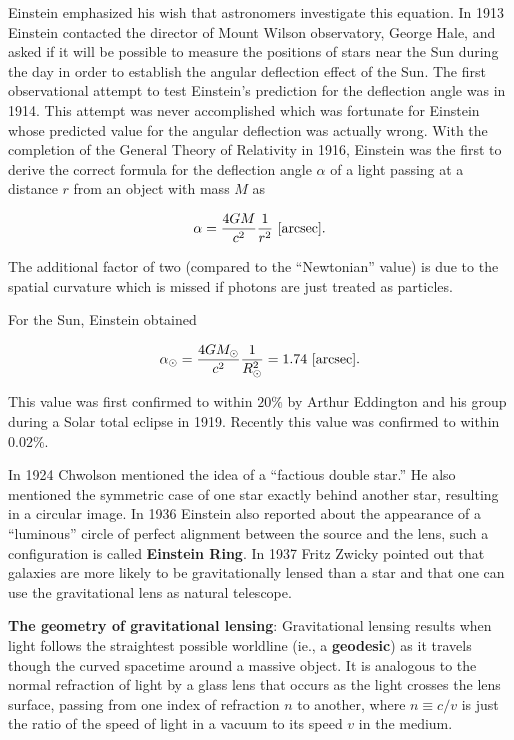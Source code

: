 \documentclass[a4paper,10pt]{article}
\begin{document}
{\noindent}Einstein emphasized his wish that astronomers investigate this equation. In 1913 Einstein contacted the director of Mount Wilson observatory, George Hale, and asked if it will be possible to measure the positions of stars near the Sun during the day in order to establish the angular deflection effect of the Sun. The first observational attempt to test Einstein's prediction for the deflection angle was in 1914. This attempt was never accomplished which was fortunate for Einstein whose predicted value for the angular deflection was actually wrong. With the completion of the General Theory of Relativity in 1916, Einstein was the first to derive the correct formula for the deflection angle $\alpha$ of a light passing at a distance $r$ from an object with mass $M$ as

\begin{align*}
    \alpha = \frac{4GM}{c^2}\frac{1}{r^2} ~ [{\rm arcsec}].
\end{align*}

{\noindent}The additional factor of two (compared to the ``Newtonian'' value) is due to the spatial curvature which is missed if photons are just treated as particles.

{\noindent}For the Sun, Einstein obtained

\begin{align*}
    \alpha_\odot = \frac{4GM_\odot}{c^2}\frac{1}{R_\odot^2} = 1.74 ~ [{\rm arcsec}].
\end{align*}

{\noindent}This value was first confirmed to within $20\%$ by Arthur Eddington and his group during a Solar total eclipse in 1919. Recently this value was confirmed to within $0.02\%$.

{\noindent}In 1924 Chwolson mentioned the idea of a ``factious double star.'' He also mentioned the symmetric case of one star exactly behind another star, resulting in a circular image. In 1936 Einstein also reported about the appearance of a ``luminous'' circle of perfect alignment between the source and the lens, such a configuration is called \textbf{Einstein Ring}. In 1937 Fritz Zwicky pointed out that galaxies are more likely to be gravitationally lensed than a star and that one can use the gravitational lens as natural telescope.

{\noindent}\textbf{The geometry of gravitational lensing}: Gravitational lensing results when light follows the straightest possible worldline (ie., a \textbf{geodesic}) as it travels though the curved spacetime around a massive object. It is analogous to the normal refraction of light by a glass lens that occurs as the light crosses the lens surface, passing from one index of refraction $n$ to another, where $n\equiv c/v$ is just the ratio of the speed of light in a vacuum to its speed $v$ in the medium. 
\end{document}
